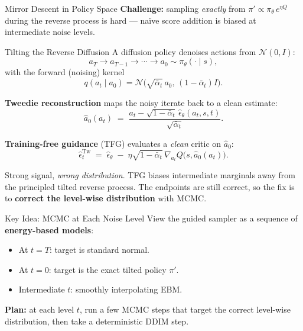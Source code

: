 \documentclass[final,hyperref={pdfpagelabels=false}]{beamer}
\newlength{\colwidth}
\begin{document}
\begin{frame}[t]
\begin{columns}[t]
\begin{column}{\colwidth}
\begin{block}{\Large Mirror Descent in Policy Space}
\vspace{0.4em}
\textbf{Challenge:} sampling \emph{exactly} from $\pi'\propto \pi_\theta\,e^{\eta Q}$ during the reverse process is hard --- na\"ive score addition is biased at intermediate noise levels.
\end{block}

\vspace{0.5cm}

\begin{block}{\Large Tilting the Reverse Diffusion}
A diffusion policy denoises actions from $\mathcal{N}(0,I)$:
\[
  a_T \to a_{T-1} \to \cdots \to a_0 \sim \pi_\theta(\cdot\mid s),
\]
with the forward (noising) kernel
\[
  q(a_t\mid a_0)=\mathcal{N}\!\bigl(\sqrt{\bar\alpha_t}\,a_0,\,(1-\bar\alpha_t)I\bigr).
\]

\vspace{0.3em}
\textbf{Tweedie reconstruction} maps the noisy iterate back to a clean estimate:
\[
  \hat{a}_0(a_t)\;=\;\frac{a_t-\sqrt{1-\bar\alpha_t}\,\hat\epsilon_\theta(a_t,s,t)}{\sqrt{\bar\alpha_t}}.
\]

\vspace{0.3em}
\textbf{Training-free guidance} (TFG) evaluates a \emph{clean} critic on $\hat a_0$:
\[
  \hat\epsilon^{\mathrm{Tw}}_t \;=\; \hat\epsilon_\theta \;-\; \eta\sqrt{1-\bar\alpha_t}\,\nabla_{a_t} Q\bigl(s,\hat a_0(a_t)\bigr).
\]

\vspace{0.3em}
Strong signal, \emph{wrong distribution}. TFG biases intermediate marginals away from the principled tilted reverse process. The endpoints are still correct, so the fix is to \textbf{correct the level-wise distribution} with MCMC.
\end{block}

\vspace{0.5cm}

\begin{block}{\Large Key Idea: MCMC at Each Noise Level}
View the guided sampler as a sequence of \textbf{energy-based models}:
\begin{itemize}
    \item At $t=T$: target is standard normal.
    \item At $t=0$: target is the exact tilted policy $\pi'$.
    \item Intermediate $t$: smoothly interpolating EBM.
\end{itemize}

\vspace{0.4em}
\textbf{Plan:} at each level $t$, run a few MCMC steps that target the correct level-wise distribution, then take a deterministic DDIM step.
\end{block}


\end{column}
\end{columns}
\end{frame}
\end{document}
